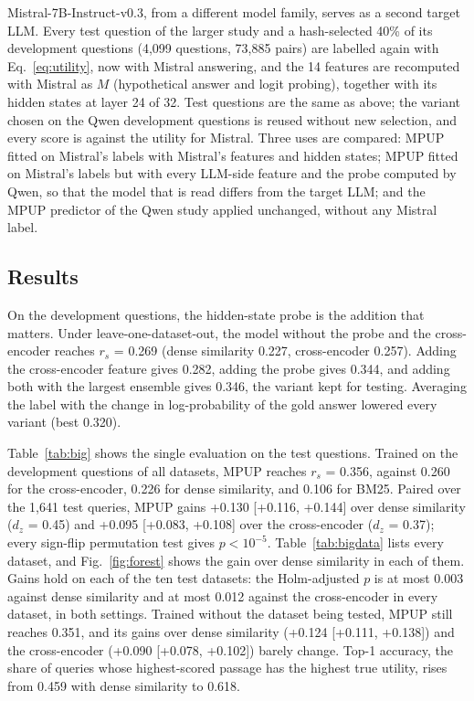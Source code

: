 \documentclass[conference]{IEEEtran}
\begin{document}
Mistral-7B-Instruct-v0.3, from a different model family, serves as a second target LLM. Every test question of the larger study and a hash-selected 40\% of its development questions (4,099 questions, 73,885 pairs) are labelled again with Eq.~\eqref{eq:utility}, now with Mistral answering, and the 14 features are recomputed with Mistral as $M$ (hypothetical answer and logit probing), together with its hidden states at layer 24 of 32. Test questions are the same as above; the variant chosen on the Qwen development questions is reused without new selection, and every score is against the utility for Mistral. Three uses are compared: MPUP fitted on Mistral's labels with Mistral's features and hidden states; MPUP fitted on Mistral's labels but with every LLM-side feature and the probe computed by Qwen, so that the model that is read differs from the target LLM; and the MPUP predictor of the Qwen study applied unchanged, without any Mistral label.

\subsection{Results}\label{sec:bigres}
On the development questions, the hidden-state probe is the addition that matters. Under leave-one-dataset-out, the model without the probe and the cross-encoder reaches $r_s$ = 0.269 (dense similarity 0.227, cross-encoder 0.257). Adding the cross-encoder feature gives 0.282, adding the probe gives 0.344, and adding both with the largest ensemble gives 0.346, the variant kept for testing. Averaging the label with the change in log-probability of the gold answer lowered every variant (best 0.320).

Table~\ref{tab:big} shows the single evaluation on the test questions. Trained on the development questions of all datasets, MPUP reaches $r_s$ = 0.356, against 0.260 for the cross-encoder, 0.226 for dense similarity, and 0.106 for BM25. Paired over the 1,641 test queries, MPUP gains +0.130 [+0.116, +0.144] over dense similarity ($d_z$ = 0.45) and +0.095 [+0.083, +0.108] over the cross-encoder ($d_z$ = 0.37); every sign-flip permutation test gives $p < 10^{-5}$. Table~\ref{tab:bigdata} lists every dataset, and Fig.~\ref{fig:forest} shows the gain over dense similarity in each of them. Gains hold on each of the ten test datasets: the Holm-adjusted $p$ is at most 0.003 against dense similarity and at most 0.012 against the cross-encoder in every dataset, in both settings. Trained without the dataset being tested, MPUP still reaches 0.351, and its gains over dense similarity (+0.124 [+0.111, +0.138]) and the cross-encoder (+0.090 [+0.078, +0.102]) barely change. Top-1 accuracy, the share of queries whose highest-scored passage has the highest true utility, rises from 0.459 with dense similarity to 0.618.
\end{document}
